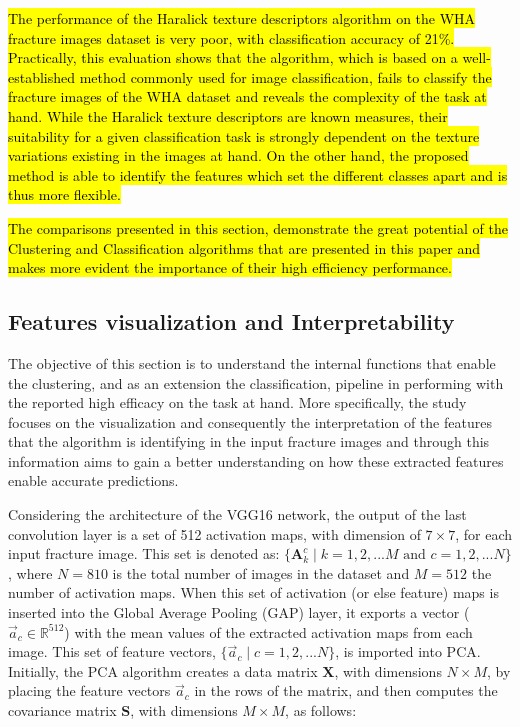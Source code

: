 \documentclass[authoryear,preprint,review,12pt, singleside]{elsarticle}
\begin{document}
\hl{The performance of the Haralick texture descriptors algorithm on the WHA fracture images dataset is very poor, with classification accuracy of 21\%. Practically, this evaluation shows that the algorithm, which is based on a well-established method commonly used for image classification, fails to classify the fracture images of the WHA dataset and reveals the complexity of the task at hand. While the Haralick texture descriptors are known measures, their suitability for a given classification task is strongly dependent on the texture variations existing in the images at hand. On the other hand, the proposed method is able to identify the features which set the different classes apart and is thus more flexible.}

\hl{The comparisons presented in this section,  demonstrate the great potential of the Clustering and Classification algorithms that are presented in this paper and makes more evident the importance of their high efficiency performance.}


\subsection{Features visualization and Interpretability}

The objective of this section is to understand the internal functions that enable the clustering, and as an extension the classification, pipeline in performing with the reported high efficacy on the task at hand. More specifically, the study focuses on the visualization and consequently the interpretation of the features that the algorithm is identifying in the input fracture images and through this information aims to gain a better understanding on how these extracted features enable accurate predictions. 

Considering the architecture of the VGG16 network, the output of the last convolution layer is a set of 512 activation maps, with dimension of $7 \times 7$, for each input fracture image. This set is  denoted as: $\{\textbf{A}_k^c \; | \; k=1,2, ... M \text{ and } c=1,2, ... N\}$, where $N=810$ is the total number of images in the dataset and $M=512$ the number of activation maps. When this set of activation (or else feature) maps is inserted into the Global Average Pooling (GAP) layer, it exports a vector ($\vec{a}_c \in \mathbb{R}^{512}$) with the mean values of the extracted activation maps from each image. This set of feature vectors, $\{\vec{a}_c \; | \; c=1,2, ... N\}$, is imported into PCA. Initially, the PCA algorithm creates a data matrix $\textbf{X}$, with dimensions $N \times M$, by placing the feature vectors $\vec{a}_c$ in the rows of the matrix, and then computes the covariance matrix $\textbf{S}$, with dimensions $M \times M$, as follows: 
\end{document}
